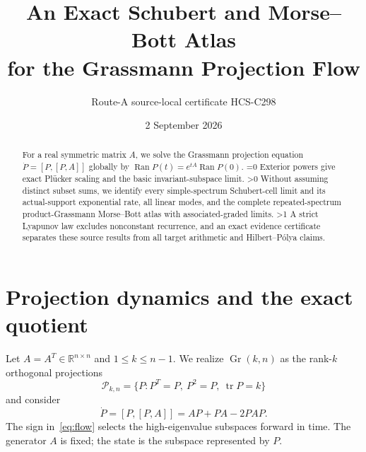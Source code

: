\documentclass[10pt]{article}
\title{An Exact Schubert and Morse--Bott Atlas\\
for the Grassmann Projection Flow}
\author{Route-A source-local certificate HCS-C298}
\date{2 September 2026}
\providecommand{\CRevisionRound}{2}
\newcommand{\R}{\mathbb R}
\newcommand{\Gr}{\operatorname{Gr}}
\newcommand{\Ran}{\operatorname{Ran}}
\newcommand{\tr}{\operatorname{tr}}
\begin{document}
\maketitle

\begin{abstract}
For a real symmetric matrix $A$, we solve the Grassmann projection equation
$\dot P=[P,[P,A]]$ globally by
$\Ran P(t)=e^{tA}\Ran P(0)$.
\ifnum\CRevisionRound=0
Exterior powers give exact Pl\"ucker scaling and the basic invariant-subspace
limit.
\fi
\ifnum\CRevisionRound>0
Without assuming distinct subset sums, we identify every simple-spectrum
Schubert-cell limit and its actual-support exponential rate, all linear modes,
and the complete repeated-spectrum product-Grassmann Morse--Bott atlas with
associated-graded limits.
\fi
\ifnum\CRevisionRound>1
A strict Lyapunov law excludes nonconstant recurrence, and an exact evidence
certificate separates these source results from all target arithmetic and
Hilbert--P\'olya claims.
\fi
\end{abstract}

\section{Projection dynamics and the exact quotient}
Let $A=A^T\in\R^{n\times n}$ and $1\le k\le n-1$.  We realize
$\Gr(k,n)$ as the rank-$k$ orthogonal projections
\[
 \mathcal P_{k,n}=\{P:P^T=P,\ P^2=P,\ \tr P=k\}
\]
and consider
\begin{equation}\label{eq:flow}
 \dot P=[P,[P,A]]=AP+PA-2PAP.
\end{equation}
The sign in~\eqref{eq:flow} selects the high-eigenvalue subspaces forward in
time.  The generator $A$ is fixed; the state is the subspace represented by
$P$.
\end{document}
